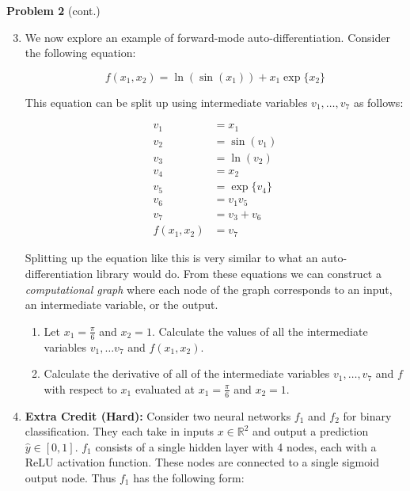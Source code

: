\documentclass[submit]{harvardml}
\begin{document}
\begin{framed}
    \noindent\textbf{Problem 2} (cont.)\\
    \begin{enumerate}
    \setcounter{enumi}{2}
    
      \item  We now explore an example of forward-mode auto-differentiation. Consider the following 
          equation:
    
          $$
            f(x_1, x_2) = \ln (\sin (x_1)) + x_1 \exp \{ x_2 \}
          $$
    
          This equation can be split up using intermediate variables $v_1, \dots, v_7$ as follows:
    
          \begin{align*}
            v_1 &= x_1 \\ 
            v_2 &= \sin (v_1) \\
            v_3 &= \ln (v_2) \\
            v_4 &= x_2 \\
            v_5 &= \exp \{ v_4 \} \\
            v_6 &= v_1v_5 \\
            v_7 &= v_3 + v_6 \\
            f(x_1, x_2) &= v_7
          \end{align*}
    
            Splitting up the equation like this is very similar to what an auto-differentiation 
            library would do. From these equations we can construct a \textit{computational graph} 
            where each node of the graph corresponds to an input, an intermediate variable, or 
            the output. 
    
        \begin{enumerate}
            \item Let $x_1 = \frac{\pi}{6}$ and $x_2 = 1$. Calculate the values of all the 
                intermediate variables $v_1, \dots v_7$ and $f(x_1,x_2)$. 
            \item Calculate the derivative of
                all of the intermediate variables $v_1, \dots, v_7$ and
                $f$ with respect to $x_1$ evaluated 
                at $x_1 = \frac{\pi}{6}$ and $x_2 = 1$.  
    
        \end{enumerate}
    
    \item \textbf{Extra Credit (Hard):} Consider two neural networks $f_1$ and $f_2$ for binary 
        classification. They each take in inputs $x \in \mathbb{R}^2$ and output a 
        prediction $\hat{y} \in [0,1]$. $f_1$
        consists of a single hidden layer with 4 nodes, each with 
        a ReLU activation function. These nodes are connected to a single sigmoid output node. Thus 
        $f_1$ has the following form:
    

\end{enumerate}
\end{framed}
\end{document}
